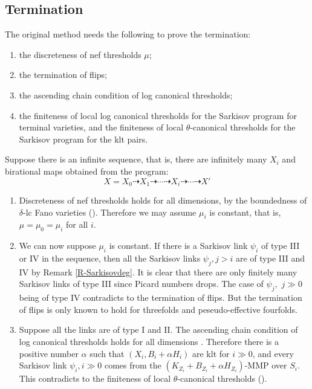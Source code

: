 \documentclass[11pt]{amsart}
\begin{document}
\subsection{Termination}\label{termination1}
The original method  needs the following to prove the termination: 
\begin{enumerate}
  \item the discreteness of nef thresholds $\mu$;
  \item the termination of flips;
  \item the ascending chain condition of log canonical thresholds;
  \item the finiteness of local log canonical thresholds for the Sarkisov program for terminal varieties, and the finiteness of local $\theta$-canonical thresholds for the Sarkisov program for the klt pairs.
\end{enumerate}
Suppose there is an infinite sequence, that is,  there are infinitely many $ X_i $ and birational maps obtained from the program:
\[ X=X_0\dashrightarrow X_1\dashrightarrow \cdots\dashrightarrow X_i \dashrightarrow\cdots\dashrightarrow X'\]
\begin{enumerate}
  \item Discreteness of nef thresholds holds for all dimensions, by the boundedness of $\delta$-lc Fano varieties (\cite[Theorem 1.1]{birkarSingularitiesLinearSystems2020}). Therefore we may assume $\mu_{i}$ is constant, that is, $\mu=\mu_{0}=\mu_{i}$ for all $i$.
  \item We can now suppose $\mu_i$ is constant. If there is a Sarkisov link $\psi_i$ of type III or IV in the sequence, then all the Sarkisov links $\psi_j, j>i$ are of type III and IV by Remark \ref{R-Sarkisovdeg}. It is clear that there are only finitely many Sarkisov links of type III since Picard numbers drops. The case of $\psi_j,$ $j\gg 0$ being of type IV contradicts to the termination of flips. But the termination of flips is only known  to hold for threefolds and peseudo-effective fourfolds.
  \item Suppose all the links are of type I and II. The ascending chain condition of log canonical thresholds  holds for all dimensions \cite{HMX14}. Therefore there is a positive number $\alpha$ such that $(X_i,B_i+\alpha H_i)$ are klt for $i\gg 0$, and every Sarkisov link $\psi_i,i\gg 0$ comes from the $(K_{Z_i}+B_{Z_i}+\alpha H_{Z_i})$-MMP over $S_i$. This contradicts to the finiteness of local $\theta$-canonical thresholds (\cite[Claim 2.2]{brunoLogSarkisovProgram1995}).
\end{enumerate}
\end{document}
